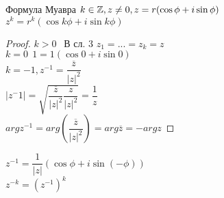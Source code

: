\begin{consequence} Формула Муавра
	$ k \in \mathbb{Z}, z \neq 0 , z = r(\cos \phi + i \sin \phi) $ \\
	$  z^k = r^k (\cos k\phi + i \sin k\phi)$ 
	\begin{proof}
		$ k > 0 \  \ $ В сл. 3 $ z_1 = ... = z_k = z $ \\
		$ k = 0 \ \  1 = 1(\cos 0 + i \sin 0) $ \\
		$ k = -1 , z^{-1} = \dfrac{\overline{z}}{|z|^2} $ \\
		$ |z^-1| = \sqrt{ \dfrac{\overline{z}}{|z|^2}  \dfrac{z}{|z|^2}}  = \dfrac{1}{z} $ \\
		$ arg z^{-1} = arg(  \dfrac{\overline{z}}{|z|^2} ) = arg \overline{z} = - arg z $
	\end{proof}
	$ z^{-1} = \dfrac{1}{|z|} (\cos\phi + i \sin (-\phi)) $ \\
	$ z^{-k} = (z^{-1})^k $
\end{consequence}

